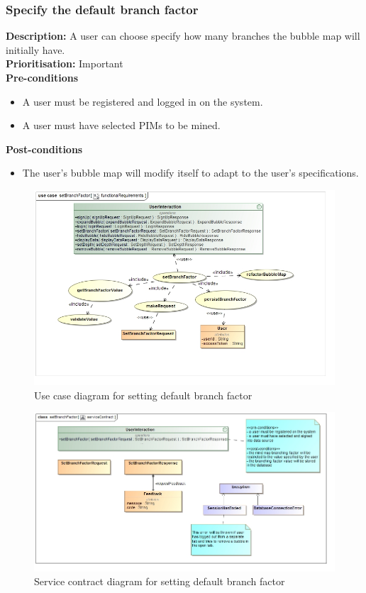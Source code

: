 \documentclass[hidelinks,english]{article}
\begin{document}
    		\subsubsection{Specify the default branch factor}
				\textbf{Description:}  A user can choose specify how many branches the bubble map will initially have.\\
			    \textbf{Prioritisation:} Important\\
      			\textbf{Pre-conditions}
			    \begin{itemize}
			        \item A user must be registered and logged in on the system.
			        \item A user must have selected PIMs to be mined.
			    \end{itemize}
    			\textbf{Post-conditions}
			    \begin{itemize}
			    	\item The user's bubble map will modify itself to adapt to the user's specifications.
    			\end{itemize}
    			
    			\begin{figure}[!h]
    			\includegraphics[width=\linewidth]{functionalRequirementsSetBranchFactor.jpg}
    			\caption{Use case diagram for setting default branch factor}
    			\label{UseCaseDisplayData}
    			\end{figure}
    			
    			\begin{figure}[!h]
    			\includegraphics[width=\linewidth]{serviceContractSetBranchFactor.jpg}
    			\caption{Service contract diagram for setting default branch factor}
    			\label{ServiceContractDisplayData}
    			\end{figure}
    			
\end{document}
